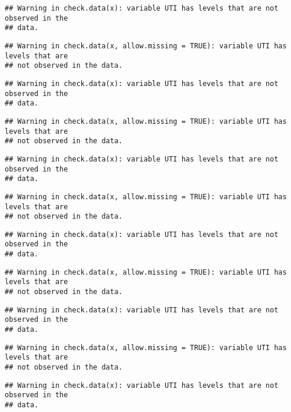 \documentclass[
]{article}
\begin{document}
\begin{verbatim}
## Warning in check.data(x): variable UTI has levels that are not observed in the
## data.
\end{verbatim}

\begin{verbatim}
## Warning in check.data(x, allow.missing = TRUE): variable UTI has levels that are
## not observed in the data.
\end{verbatim}

\begin{verbatim}
## Warning in check.data(x): variable UTI has levels that are not observed in the
## data.
\end{verbatim}

\begin{verbatim}
## Warning in check.data(x, allow.missing = TRUE): variable UTI has levels that are
## not observed in the data.
\end{verbatim}

\begin{verbatim}
## Warning in check.data(x): variable UTI has levels that are not observed in the
## data.
\end{verbatim}

\begin{verbatim}
## Warning in check.data(x, allow.missing = TRUE): variable UTI has levels that are
## not observed in the data.
\end{verbatim}

\begin{verbatim}
## Warning in check.data(x): variable UTI has levels that are not observed in the
## data.
\end{verbatim}

\begin{verbatim}
## Warning in check.data(x, allow.missing = TRUE): variable UTI has levels that are
## not observed in the data.
\end{verbatim}

\begin{verbatim}
## Warning in check.data(x): variable UTI has levels that are not observed in the
## data.
\end{verbatim}

\begin{verbatim}
## Warning in check.data(x, allow.missing = TRUE): variable UTI has levels that are
## not observed in the data.
\end{verbatim}

\begin{verbatim}
## Warning in check.data(x): variable UTI has levels that are not observed in the
## data.
\end{verbatim}
\end{document}
